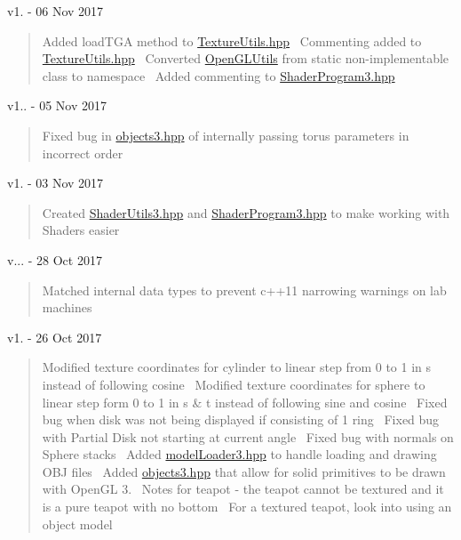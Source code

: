 v1. -\/ 06 Nov 2017 \begin{quote}
Added load\+T\+GA method to \hyperlink{_texture_utils_8hpp}{Texture\+Utils.\+hpp}~\newline
Commenting added to \hyperlink{_texture_utils_8hpp}{Texture\+Utils.\+hpp}~\newline
Converted \hyperlink{namespace_open_g_l_utils}{Open\+G\+L\+Utils} from static non-\/implementable class to namespace~\newline
Added commenting to \hyperlink{_shader_program3_8hpp}{Shader\+Program3.\+hpp} \end{quote}


v1.. -\/ 05 Nov 2017 \begin{quote}
Fixed bug in \hyperlink{objects3_8hpp}{objects3.\+hpp} of internally passing torus parameters in incorrect order \end{quote}


v1. -\/ 03 Nov 2017 \begin{quote}
Created \hyperlink{_shader_utils3_8hpp}{Shader\+Utils3.\+hpp} and \hyperlink{_shader_program3_8hpp}{Shader\+Program3.\+hpp} to make working with Shaders easier \end{quote}


v... -\/ 28 Oct 2017 \begin{quote}
Matched internal data types to prevent c++11 narrowing warnings on lab machines \end{quote}


v1. -\/ 26 Oct 2017 \begin{quote}
Modified texture coordinates for cylinder to linear step from 0 to 1 in s instead of following cosine~\newline
Modified texture coordinates for sphere to linear step form 0 to 1 in s \& t instead of following sine and cosine~\newline
Fixed bug when disk was not being displayed if consisting of 1 ring~\newline
Fixed bug with Partial Disk not starting at current angle~\newline
Fixed bug with normals on Sphere stacks~\newline
Added \hyperlink{model_loader3_8hpp}{model\+Loader3.\+hpp} to handle loading and drawing O\+BJ files~\newline
Added \hyperlink{objects3_8hpp}{objects3.\+hpp} that allow for solid primitives to be drawn with Open\+GL 3.~\newline
Notes for teapot -\/ the teapot cannot be textured and it is a pure teapot with no bottom~\newline
For a textured teapot, look into using an object model \end{quote}


